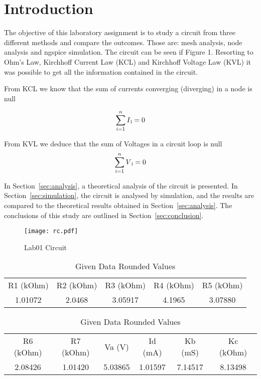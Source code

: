 \section{Introduction}
\label{sec:introduction}

The objective of this laboratory assignment is to study a circuit from three different methods and compare the outcomes. Those are: mesh analysis, node analysis and ngspice simulation.
The circuit can be seen if Figure 1.
Resorting to Ohm's Law, Kirchhoff Current Law (KCL) and Kirchhoff Voltage Law (KVL) it was possible to get all the information contained in the circuit. 

From KCL we know that the sum of currents converging (diverging) in
a node is null

\[ \sum_{i=1}^{n} I\textsubscript{i} = 0 \]

From KVL we deduce that the sum of Voltages
in a circuit loop is null
\[ \sum_{i=1}^{n} V\textsubscript{i} = 0 \]

In Section~\ref{sec:analysis}, a theoretical analysis of the circuit is
presented. In Section~\ref{sec:simulation}, the circuit is analysed by
simulation, and the results are compared to the theoretical results obtained in
Section~\ref{sec:analysis}. The conclusions of this study are outlined in
Section~\ref{sec:conclusion}.

\begin{figure}[h] \centering
\texttt{[image: rc.pdf]}
\caption{Lab01 Circuit}
\label{fig:rc}
\end{figure}


\begin{table}[h]
    \centering
    \begin{tabular}{c|c|c|c|c}
        \hline
        R1 (kOhm)& R2 (kOhm)& R3 (kOhm)& R4 (kOhm)& R5 (kOhm) \\
        1.01072 & 2.0468 & 3.05917 & 4.1965 & 3.07880     
    \end{tabular}
    \begin{tabular}{c|c|c|c|c|c}
        \hline
        R6 (kOhm)& R7 (kOhm)& Va (V)& Id (mA)& Kb (mS)& Kc (kOhm)\\
        2.08426 & 1.01420 & 5.03865 & 1.01597 & 7.14517 & 8.13498 \\
        \hline  
    \end{tabular}
    \caption{Given Data Rounded Values}
    \label{tab:data}
\end{table}

